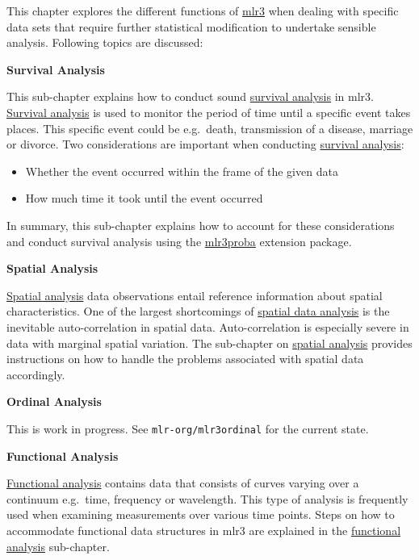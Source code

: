 \documentclass[
  11pt,
  parskip=half,
  DIV=calc,
  BCOR=10mm,
  x11names]{scrbook}
\providecommand{\tightlist}{%
  \setlength{\itemsep}{0pt}\setlength{\parskip}{0pt}}
\begin{document}
This chapter explores the different functions of \href{https://mlr3.mlr-org.com}{mlr3} when dealing with specific data sets that require further statistical modification to undertake sensible analysis.
Following topics are discussed:

\textbf{Survival Analysis}

This sub-chapter explains how to conduct sound \protect\hyperlink{survival}{survival analysis} in mlr3.
\protect\hyperlink{survival}{Survival analysis} is used to monitor the period of time until a specific event takes places.
This specific event could be e.g.~death, transmission of a disease, marriage or divorce.
Two considerations are important when conducting \protect\hyperlink{survival}{survival analysis}:

\begin{itemize}
\tightlist
\item
  Whether the event occurred within the frame of the given data
\item
  How much time it took until the event occurred
\end{itemize}

In summary, this sub-chapter explains how to account for these considerations and conduct survival analysis using the \href{https://mlr3proba.mlr-org.com}{mlr3proba} extension package.

\textbf{Spatial Analysis}

\protect\hyperlink{spatial}{Spatial analysis} data observations entail reference information about spatial characteristics.
One of the largest shortcomings of \protect\hyperlink{spatial}{spatial data analysis} is the inevitable auto-correlation in spatial data.
Auto-correlation is especially severe in data with marginal spatial variation.
The sub-chapter on \protect\hyperlink{spatial}{spatial analysis} provides instructions on how to handle the problems associated with spatial data accordingly.

\textbf{Ordinal Analysis}

This is work in progress.
See \texttt{mlr-org/mlr3ordinal} for the current state.

\textbf{Functional Analysis}

\protect\hyperlink{functional}{Functional analysis} contains data that consists of curves varying over a continuum e.g.~time, frequency or wavelength.
This type of analysis is frequently used when examining measurements over various time points.
Steps on how to accommodate functional data structures in mlr3 are explained in the \protect\hyperlink{functional}{functional analysis} sub-chapter.
\end{document}
